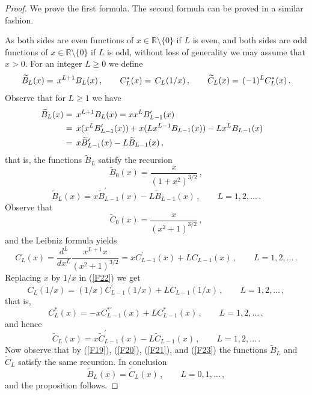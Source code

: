 \documentclass{article}
\theoremstyle{remark}
\numberwithin{equation}{section}
\begin{document}
\begin{proof} We prove the first formula.  The second formula can be proved in a similar fashion.  

As both sides are even functions of $x \in {\mathbb R} \setminus \{0\}$ if $L$ is even, 
and both sides are odd functions of $x \in {\mathbb R} \setminus \{0\}$ if $L$ is odd, without loss of generality we may assume that $x > 0$.
For an integer $L \geq 0$ we define
\begin{equation} \notag 
\widetilde{B}_L(x) = \, x^{L+1} B_L(x)\,, \qquad C_L^*(x) = \, C_L(1/x)\,, \qquad \widetilde{C}_L(x)  = \, (-1)^L C_L^*(x)\,.
\end{equation}
Observe that for $L \geq 1$ we have
\begin{equation} \notag \begin{split} \widetilde{B}_L(x) & = \, x^{L+1} B_L(x) = x  x^L B_{L-1}^\prime(x) \cr 
& = \, x(x^L B_{L-1}^\prime(x)) + x(Lx^{L-1} B_{L-1}(x)) - Lx^L B_{L-1}(x) \cr 
& = \, x\widetilde{B}_{L-1}^{\prime}(x) - L\widetilde{B}_{L-1}(x)\,, \cr \end{split}
\end{equation}
that is, the functions $\widetilde{B}_L$ satisfy the recursion
\begin{equation} \label{F19} \widetilde{B}_0(x) = \frac{x}{(1+x^2)^{3/2}}\,, 
\end{equation}
\begin{equation} \label{F20}
\widetilde{B}_L(x) =  x\widetilde{B}_{L-1}^{\prime}(x) - L\widetilde{B}_{L-1}(x)\,, \qquad  L=1,2,\ldots\,.  
\end{equation}
Observe that
\begin{equation} \label{F21} \widetilde{C}_0(x) = \frac{x}{(x^2+1)^{3/2}}\,, 
\end{equation}
and the Leibniz formula yields
\begin{equation} \label{F22} C_L(x) = \frac{d^L}{dx^L} \frac{x^{L+1}x}{(x^2+1)^{3/2}} = xC_{L-1}^\prime(x) + LC_{L-1}(x)\,, \qquad L=1,2,\ldots\,. 
\end{equation}
Replacing $x$ by $1/x$ in (\ref{F22}) we get
$$C_L(1/x) = (1/x)C_{L-1}^\prime(1/x) + LC_{L-1}(1/x)\,, \qquad L=1,2,\ldots\,,$$
that is,
$$C_L^*(x) = -xC_{L-1}^{*\prime}(x) + LC_{L-1}^*(x)\,, \qquad L=1,2,\ldots\,,$$
and hence
\begin{equation} \label{F23}
\widetilde{C}_L(x) =  x\widetilde{C}_{L-1}^{\prime}(x) - L\widetilde{C}_{L-1}(x)\,, \qquad  L=1,2,\ldots\,.  
\end{equation}
Now observe that by (\ref{F19}), (\ref{F20}), (\ref{F21}), and (\ref{F23}) the functions $\widetilde{B}_L$ and $\widetilde{C}_L$ satisfy the same
recursion. In conclusion
$$\widetilde{B}_L(x) = \widetilde{C}_L(x)\,, \qquad L=0,1,\ldots\,,$$
and the proposition follows.
\end{proof}
\end{document}
